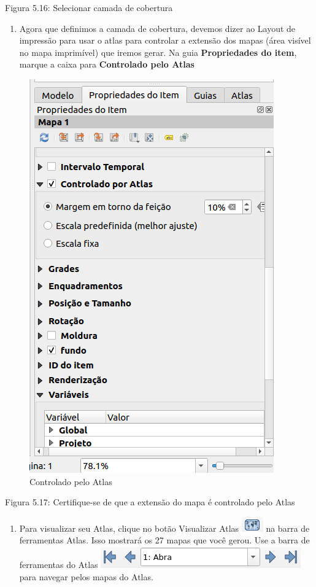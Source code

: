 \documentclass[
]{book}
\providecommand{\tightlist}{%
  \setlength{\itemsep}{0pt}\setlength{\parskip}{0pt}}
\begin{document}
Figura 5.16: Selecionar camada de cobertura

\begin{enumerate}
\def\labelenumi{\arabic{enumi}.}
\setcounter{enumi}{3}
\tightlist
\item
  Agora que definimos a camada de cobertura, devemos dizer ao Layout de impressão para usar o atlas para controlar a extensão dos mapas (área visível no mapa imprimível) que iremos gerar. Na guia \textbf{Propriedades do item}, marque a caixa para \textbf{Controlado pelo Atlas}
\end{enumerate}

\begin{figure}
\centering
\includegraphics{media/modulo5/atlas-controlled.png}
\caption{Controlado pelo Atlas}
\end{figure}

Figura 5.17: Certifique-se de que a extensão do mapa é controlado pelo Atlas

\begin{enumerate}
\def\labelenumi{\arabic{enumi}.}
\setcounter{enumi}{4}
\tightlist
\item
  Para visualizar seu Atlas, clique no botão Visualizar Atlas \includegraphics{media/modulo5/atlas-preview-btn.png} na barra de ferramentas Atlas. Isso mostrará os 27 mapas que você gerou. Use a barra de ferramentas do Atlas \includegraphics{media/modulo5/atlas-toolbar-nav.png} para navegar pelos mapas do Atlas.
\end{enumerate}
\end{document}
